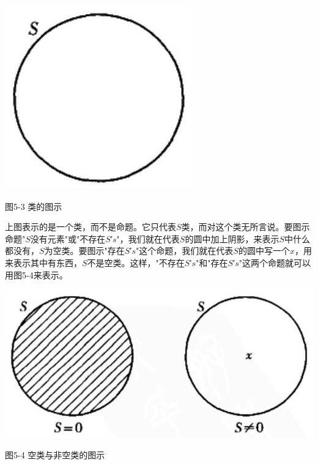 \begin{center}
\includegraphics[width=\textwidth]{images/2025_05_15_6a28331d5e7c993ad07ag-257.jpg}

图5-3 类的图示
\end{center}

上图表示的是一个类，而不是命题。它只代表$S$类，而对这个类无所言说。要图示命题"$S$没有元素"或"不存在$S$′$s$"，我们就在代表$S$的圆中加上阴影，来表示$S$中什么都没有，$S$为空类。要图示"存在$S$′$s$"这个命题，我们就在代表$S$的圆中写一个$x$，用来表示其中有东西，$S$不是空类。这样，"不存在$S$′$s$"和"存在$S$′$s$"这两个命题就可以用图5-4来表示。

\begin{center}
\includegraphics[width=\textwidth]{images/2025_05_15_6a28331d5e7c993ad07ag-257(1).jpg}

图5-4 空类与非空类的图示
\end{center}


